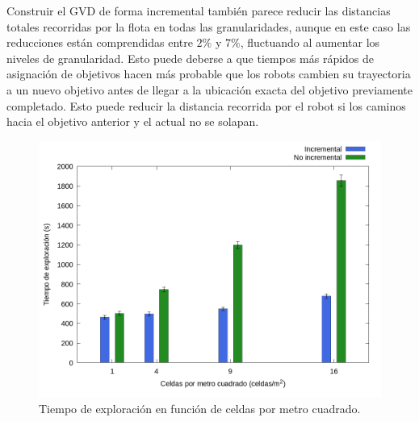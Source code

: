 
Construir el GVD de forma incremental también parece reducir las distancias
totales recorridas por la flota en todas las granularidades, aunque en este
caso las reducciones están comprendidas entre $2\%$ y $7\%$, fluctuando al
aumentar los niveles de granularidad. Esto puede deberse a que tiempos más
rápidos de asignación de objetivos hacen más probable que los robots cambien su
trayectoria a un nuevo objetivo antes de llegar a la ubicación exacta del
objetivo previamente completado. Esto puede reducir la distancia recorrida por
el robot si los caminos hacia el objetivo anterior y el actual no se solapan.








\begin{figure}[H]
  \centerfloat

  \includegraphics[clip=true, width=\graphlen]{imagenes/graficas_chicas/graficas_histo_num/incrementalidad/exploration_time.png}

  \caption{Tiempo de exploración en función de celdas por metro cuadrado.}\label{fig:gra:inc:et}

\end{figure}

